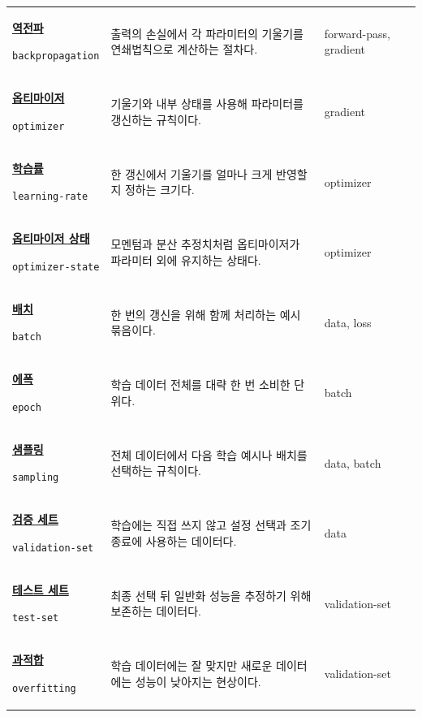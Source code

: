 \begin{longtable}{p{} p{} p{}}
\hypertarget{glossary:backpropagation}{\hyperref[bg:backpropagation]{\textbf{역전파}}} \newline\texttt{backpropagation} & 출력의 손실에서 각 파라미터의 기울기를 연쇄법칙으로 계산하는 절차다. & \scriptsize forward-pass, gradient \\
\hypertarget{glossary:optimizer}{\hyperref[bg:optimizer]{\textbf{옵티마이저}}} \newline\texttt{optimizer} & 기울기와 내부 상태를 사용해 파라미터를 갱신하는 규칙이다. & \scriptsize gradient \\
\hypertarget{glossary:learning-rate}{\hyperref[bg:learning-rate]{\textbf{학습률}}} \newline\texttt{learning-rate} & 한 갱신에서 기울기를 얼마나 크게 반영할지 정하는 크기다. & \scriptsize optimizer \\
\hypertarget{glossary:optimizer-state}{\hyperref[bg:optimizer-state]{\textbf{옵티마이저 상태}}} \newline\texttt{optimizer-state} & 모멘텀과 분산 추정치처럼 옵티마이저가 파라미터 외에 유지하는 상태다. & \scriptsize optimizer \\
\hypertarget{glossary:batch}{\hyperref[bg:batch]{\textbf{배치}}} \newline\texttt{batch} & 한 번의 갱신을 위해 함께 처리하는 예시 묶음이다. & \scriptsize data, loss \\
\hypertarget{glossary:epoch}{\hyperref[bg:epoch]{\textbf{에폭}}} \newline\texttt{epoch} & 학습 데이터 전체를 대략 한 번 소비한 단위다. & \scriptsize batch \\
\hypertarget{glossary:sampling}{\hyperref[bg:sampling]{\textbf{샘플링}}} \newline\texttt{sampling} & 전체 데이터에서 다음 학습 예시나 배치를 선택하는 규칙이다. & \scriptsize data, batch \\
\hypertarget{glossary:validation-set}{\hyperref[bg:validation-set]{\textbf{검증 세트}}} \newline\texttt{validation-set} & 학습에는 직접 쓰지 않고 설정 선택과 조기 종료에 사용하는 데이터다. & \scriptsize data \\
\hypertarget{glossary:test-set}{\hyperref[bg:test-set]{\textbf{테스트 세트}}} \newline\texttt{test-set} & 최종 선택 뒤 일반화 성능을 추정하기 위해 보존하는 데이터다. & \scriptsize validation-set \\
\hypertarget{glossary:overfitting}{\hyperref[bg:overfitting]{\textbf{과적합}}} \newline\texttt{overfitting} & 학습 데이터에는 잘 맞지만 새로운 데이터에는 성능이 낮아지는 현상이다. & \scriptsize validation-set \\

\end{longtable}
